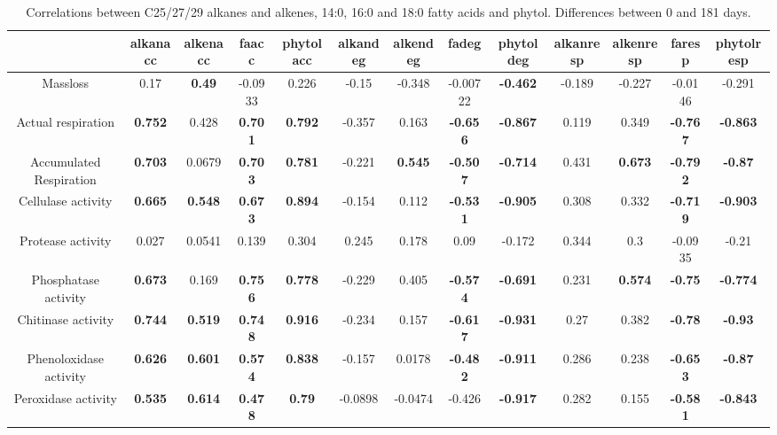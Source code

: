 \documentclass[10pt]{article}
\begin{document}
\newpage
\begin{landscape}
\begin{table}[h!]
\begin{center}
\caption{Correlations between C25/27/29 alkanes and alkenes, 14:0, 16:0 and 18:0 fatty acids and phytol. Differences between 0 and 181 days.}
\label{corrtable_notlig}
{\tiny
\begin{tabular}{ccccccccccccc}
  \hline
 & alkanacc & alkenacc & faacc & phytolacc & alkandeg & alkendeg & fadeg & phytoldeg & alkanresp & alkenresp & faresp & phytolresp \\ 
  \hline
Massloss & 0.17 & \textbf{ 0.49 } & -0.0933 & 0.226 & -0.15 & -0.348 & -0.00722 & \textbf{ -0.462 } & -0.189 & -0.227 & -0.0146 & -0.291 \\ 
  Actual respiration & \textbf{ 0.752 } & 0.428 & \textbf{ 0.701 } & \textbf{ 0.792 } & -0.357 & 0.163 & \textbf{ -0.656 } & \textbf{ -0.867 } & 0.119 & 0.349 & \textbf{ -0.767 } & \textbf{ -0.863 } \\ 
  Accumulated Respiration & \textbf{ 0.703 } & 0.0679 & \textbf{ 0.703 } & \textbf{ 0.781 } & -0.221 & \textbf{ 0.545 } & \textbf{ -0.507 } & \textbf{ -0.714 } & 0.431 & \textbf{ 0.673 } & \textbf{ -0.792 } & \textbf{ -0.87 } \\ 
  Cellulase activity & \textbf{ 0.665 } & \textbf{ 0.548 } & \textbf{ 0.673 } & \textbf{ 0.894 } & -0.154 & 0.112 & \textbf{ -0.531 } & \textbf{ -0.905 } & 0.308 & 0.332 & \textbf{ -0.719 } & \textbf{ -0.903 } \\ 
  Protease activity & 0.027 & 0.0541 & 0.139 & 0.304 & 0.245 & 0.178 & 0.09 & -0.172 & 0.344 &  0.3 & -0.0935 & -0.21 \\ 
  Phosphatase activity & \textbf{ 0.673 } & 0.169 & \textbf{ 0.756 } & \textbf{ 0.778 } & -0.229 & 0.405 & \textbf{ -0.574 } & \textbf{ -0.691 } & 0.231 & \textbf{ 0.574 } & \textbf{ -0.75 } & \textbf{ -0.774 } \\ 
  Chitinase activity & \textbf{ 0.744 } & \textbf{ 0.519 } & \textbf{ 0.748 } & \textbf{ 0.916 } & -0.234 & 0.157 & \textbf{ -0.617 } & \textbf{ -0.931 } & 0.27 & 0.382 & \textbf{ -0.78 } & \textbf{ -0.93 } \\ 
  Phenoloxidase activity & \textbf{ 0.626 } & \textbf{ 0.601 } & \textbf{ 0.574 } & \textbf{ 0.838 } & -0.157 & 0.0178 & \textbf{ -0.482 } & \textbf{ -0.911 } & 0.286 & 0.238 & \textbf{ -0.653 } & \textbf{ -0.87 } \\ 
  Peroxidase activity & \textbf{ 0.535 } & \textbf{ 0.614 } & \textbf{ 0.478 } & \textbf{ 0.79 } & -0.0898 & -0.0474 & -0.426 & \textbf{ -0.917 } & 0.282 & 0.155 & \textbf{ -0.581 } & \textbf{ -0.843 } \\ 

\end{tabular}}
\end{center}
\end{table}
\end{landscape}
\end{document}
